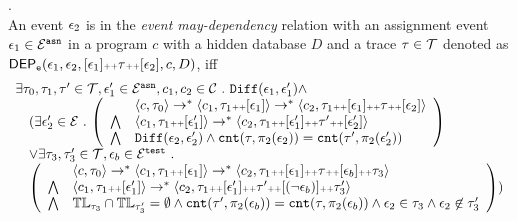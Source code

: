 \begin{defn}.
\label{def:event_dep}
\\ 
  An event $\mathtt{\epsilon}_2$ is in the \emph{event may-dependency} relation with an assignment
  event $\mathtt{\epsilon}_1 \in \mathcal{E}^{\mathtt{{asn}}}$ in a program ${c}$
  with a hidden database $D$ and a trace $\mathtt{\tau} \in \mathcal{T}$ denoted as 
  $\mathsf{DEP_{\mathtt{e}}}(\mathtt{\epsilon}_1, \mathtt{\epsilon}_2, [\mathtt{\epsilon}_1 ] {\scriptscriptstyle ++} \mathtt{\tau} {\scriptscriptstyle ++} [\mathtt{\epsilon}_2], c, D)$, iff
  \[
    \begin{array}{l}
  \exists \vtrace_0,
  \vtrace_1, \vtrace' \in \mathcal{T},\event_1' \in \eventset^{\asn}, {c}_1, {c}_2  \in \cdom  \sthat
  \diff(\event_1, \event_1') \land 
      \\ \quad
      (
        \exists  \event_2' \in \eventset \sthat 
    \left(
    \begin{array}{ll}   
   & \config{{c}, \vtrace_0} \rightarrow^{*} 
  \config{{c}_1, \vtrace_1 \tracecat [\event_1]}  \rightarrow^{*} 
    \config{{c}_2,  \vtrace_1 \tracecat [\event_1] \tracecat \vtrace \tracecat [\event_2] } 
   \\ 
   \bigwedge &
    \config{{c}_1, \vtrace_1 \tracecat [\event_1']}  \rightarrow^{*} 
    \config{{c}_2,  \vtrace_1 \tracecat[ \event_1'] \tracecat \vtrace' \tracecat [\event_2'] } 
  \\
  \bigwedge & 
  \diff(\event_2,\event_2' ) \land 
  \vcounter(\vtrace, \pi_2(\event_2))
  = 
  \vcounter(\vtrace', \pi_2(\event_2'))\\
  \end{array}
  \right)
  \\ \quad
  \lor 
  \exists \vtrace_3, \vtrace_3'  \in \mathcal{T}, \event_b \in \eventset^{\test} \sthat 
  \\ \quad
  \left(
  \begin{array}{ll}   
    & \config{{c}, \vtrace_0} \rightarrow^{*} 
      \config{{c}_1, \vtrace_1 \tracecat [\event_1]}  \rightarrow^{*} 
      \config{c_2,  \vtrace_1 \tracecat [\event_1] \tracecat \trace \tracecat [\event_b] \tracecat  \trace_3} 
    \\ 
    \bigwedge &
    \config{{c}_1, \vtrace_1 \tracecat [\event_1']}  \rightarrow^{*} 
    \config{c_2,  \vtrace_1 \tracecat [\event_1'] \tracecat \trace' \tracecat [(\neg \event_b)] \tracecat \trace_3'} 
    \\
    \bigwedge &  \tlabel_{\trace_3} \cap \tlabel_{\trace_3'} = \emptyset
     \land \vcounter(\trace', \pi_2(\event_b)) = \vcounter(\trace, \pi_2(\event_b)) 
    \land \event_2 \in \trace_3
    \land \event_2 \not\in \trace_3'
  \end{array}
  \right)
  )
\end{array}
   \]
%
\end{defn}
